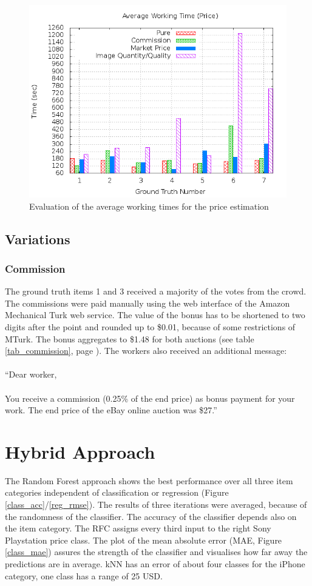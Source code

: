 \begin{figure}
\centering
\includegraphics[scale=0.55]{images/plots/crowdsourcing/plot_time_price.png}
\caption{Evaluation of the average working times for the price estimation}
\label{crowdsourcing_time_price}
\end{figure}
\subsection{Variations}
\subsubsection{Commission}
The ground truth items 1 and 3 received a majority of the votes from the crowd. The commissions were paid manually using the web interface of the Amazon Mechanical Turk web service. The value of the bonus has to be shortened to two digits after the point and rounded up to \$0.01, because of some restrictions of MTurk. The bonus aggregates to \$1.48 for both auctions (see table \ref{tab_commission}, page \pageref{tab_commission}). The workers also received an additional message:\\\\
``Dear worker, \\\\
You receive a commission (0.25\% of the end price) as bonus payment for your work. The end price of the eBay online auction was \$27.''
\section{Hybrid Approach}
The Random Forest approach shows the best performance over all three item categories independent of classification or regression (Figure \ref{class_acc}/\ref{reg_rmse}). The results of three iterations were averaged, because of the randomness of the classifier. The accuracy of the classifier depends also on the item category. The RFC assigns every third input to the right Sony Playstation price class. The plot of the mean absolute error (MAE, Figure \ref{class_mae}) assures the strength of the classifier and visualises how far away the predictions are in average. kNN has an error of about four classes for the iPhone category, one class has a range of 25 USD.

